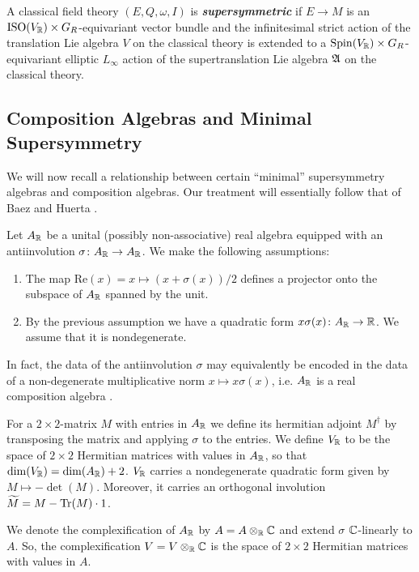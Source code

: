 \documentclass[10pt, oneside]{article}
\renewcommand{\Re}{\mathrm{Re}}
\newcommand{\defterm}[1]{\textbf{\emph{#1}}}
\begin{document}
\begin{definition}
\label{dfn: super}
A classical field theory $(E, Q, \omega, I)$ is \defterm{supersymmetric} if $E\rightarrow M$ is an $\mathrm{ISO}(V_\mathbb R)\times G_R$-equivariant vector bundle and the infinitesimal strict action of the translation Lie algebra $V$ on the classical theory is extended to a $\mathrm{Spin}(V_\mathbb R)\times G_R$-equivariant elliptic $L_\infty$ action of the supertranslation Lie algebra $\mathfrak A$ on the classical theory.
\end{definition}

\subsection{Composition Algebras and Minimal Supersymmetry}
\label{sect:compositionalgebras}

We will now recall a relationship between certain ``minimal'' supersymmetry algebras and composition algebras. Our treatment will essentially follow that of Baez and Huerta \cite{BaezHuerta}.

Let $A_\mathbb R$ be a unital (possibly non-associative) real algebra equipped with an antiinvolution $\sigma\colon A_\mathbb R\rightarrow A_\mathbb R$. We make the following assumptions:
\begin{enumerate}
\item The map $\Re(x)=x\mapsto (x + \sigma(x))/2$ defines a projector onto the subspace of $A_\mathbb R$ spanned by the unit.

\item By the previous assumption we have a quadratic form $x\sigma(x)\colon A_\mathbb R\rightarrow \mathbb R$. We assume that it is nondegenerate.
\end{enumerate}

In fact, the data of the antiinvolution $\sigma$ may equivalently be encoded in the data of a non-degenerate multiplicative norm $x\mapsto x\sigma(x)$, i.e. $A_\mathbb R$ is a real composition algebra \cite[Chapter 1.3]{SpringerVeldkamp}.

For a $2\times 2$-matrix $M$ with entries in $A_\mathbb R$ we define its hermitian adjoint $M^\dagger$ by transposing the matrix and applying $\sigma$ to the entries. We define $V_\mathbb R$ to be the space of $2\times 2$ Hermitian matrices with values in $A_\mathbb R$, so that $\dim(V_\mathbb R) = \dim(A_\mathbb R) + 2$. $V_\mathbb R$ carries a nondegenerate quadratic form given by $M\mapsto -\det(M)$. Moreover, it carries an orthogonal involution $\widetilde{M} = M - \operatorname{Tr}(M)\cdot 1$.

We denote the complexification of $A_\mathbb R$ by $A=A\otimes_\mathbb R \mathbb C$ and extend $\sigma$ $\mathbb C$-linearly to $A$. So, the complexification $V=V\otimes_\mathbb R\mathbb C$ is the space of $2\times 2$ Hermitian matrices with values in $A$.
\end{document}
